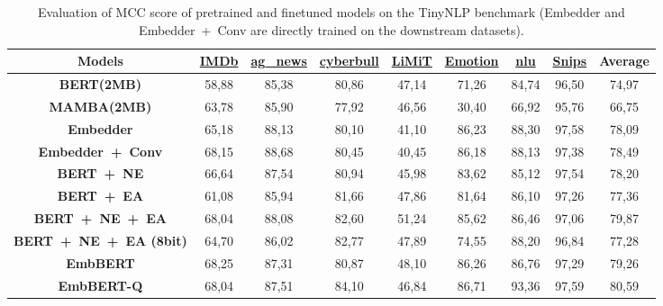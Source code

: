 




\begin{table*}[htbp]
    \caption{Evaluation of MCC score of pretrained and finetuned models on the TinyNLP benchmark (Embedder and Embedder~+~Conv are directly trained on the downstream datasets).}
    \begin{center}
        \begin{tabular}{| c | c c c c c c c c |}
        \hline
        \textbf{Models} & \href{https://huggingface.co/datasets/stanfordnlp/imdb}{\textbf{IMDb}} & \href{https://huggingface.co/datasets/fancyzhx/ag_news}{\textbf{ag\_news}} & \href{https://www.kaggle.com/datasets/andrewmvd/cyberbullying-classification}{\textbf{cyberbull}} & \href{https://huggingface.co/datasets/IBM/limit}{\textbf{LiMiT}} & \href{https://huggingface.co/datasets/dair-ai/emotion}{\textbf{Emotion}} & \href{https://huggingface.co/datasets/xingkunliuxtracta/nlu_evaluation_data}{\textbf{nlu}} & \href{https://huggingface.co/datasets/benayas/snips}{\textbf{Snips}} & \textbf{Average} \\
        \hline \hline
        \textbf{BERT(2MB)}           & 58,88 & 85,38 & 80,86 & 47,14 & 71,26 & 84,74 & 96,50 & 74,97 \\
        \textbf{MAMBA(2MB)}          & 63,78 & 85,90 & 77,92 & 46,56 & 30,40 & 66,92 & 95,76 & 66,75 \\
        \textbf{Embedder}           & 65,18 & 88,13 & 80,10 & 41,10 & 86,23 & 88,30 & 97,58 & 78,09 \\
        \textbf{Embedder~+~Conv}      & 68,15 & 88,68 & 80,45 & 40,45 & 86,18 & 88,13 & 97,38 & 78,49 \\
        \textbf{BERT~+~NE}            & 66,64 & 87,54 & 80,94 & 45,98 & 83,62 & 85,12 & 97,54 & 78,20 \\
        \textbf{BERT~+~EA}            & 61,08 & 85,94 & 81,66 & 47,86 & 81,64 & 86,10 & 97,26 & 77,36 \\
        \textbf{BERT~+~NE~+~EA}         & 68,04 & 88,08 & 82,60 & 51,24 & 85,62 & 86,46 & 97,06 & 79,87 \\
        \textbf{BERT~+~NE~+~EA (8bit)}  & 64,70 & 86,02 & 82,77 & 47,89 & 74,55 & 88,20 & 96,84 & 77,28 \\
        \hline
        \textbf{EmbBERT}            & 68,25 & 87,31 & 80,87 & 48,10 & 86,26 & 86,76 & 97,29 & 79,26 \\
        \textbf{EmbBERT-Q}      & 68,04 & 87,51 & 84,10 & 46,84 & 86,71 & 93,36 & 97,59 & 80,59 \\
        \hline
        \end{tabular}
        \label{table:all_results_tinyNLP_mcc}
    \end{center} 
\end{table*}



